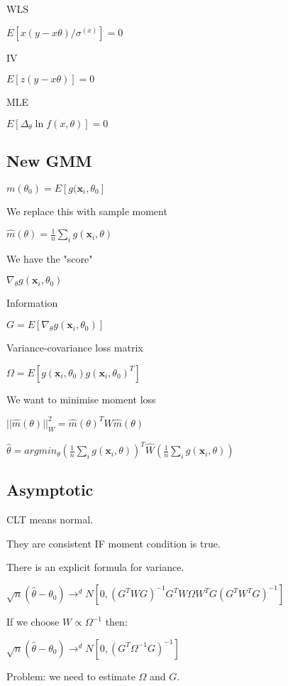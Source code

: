 WLS

\(E[x(y-x\theta)/\sigma^(x)]=0\)

IV

\(E[z(y-x\theta)]=0\)

MLE

\(E[\Delta_\theta \ln f(x, \theta)]=0\)








\subsection{New GMM}


\(m(\theta_0)=E[g(\mathbf x_i, \theta_0]\)

We replace this with sample moment

\(\hat m(\theta)=\frac{1}{n}\sum_ig(\mathbf x_i, \theta)\)

We have the "score"

\(\nabla_\theta g(\mathbf x_i, \theta_0)\)

Information

\(G=E[\nabla_\theta g(\mathbf x_i, \theta_0)]\)

Variance-covariance loss matrix

\(\Omega =E[g(\mathbf x_i, \theta_0)g(\mathbf x_i, \theta_0)^T]\)

We want to minimise moment loss

\(||\hat m(\theta)||^2_W=\hat m(\theta )^TW\hat m(\theta)\)

\(\hat \theta = argmin_\theta (\frac{1}{n}\sum_ig(\mathbf x_i, \theta))^T\hat W(\frac{1}{n}\sum_ig(\mathbf x_i, \theta))\)

\subsection{Asymptotic}

CLT means normal.

They are consistent IF moment condition is true.

There is an explicit formula for variance.


\(\sqrt n (\hat \theta -\theta_0)\rightarrow^d N[0, (G^TWG)^{-1}G^TW\Omega W^TG(G^TW^TG)^{-1}]\)

If we choose \(W\propto \Omega^{-1}\) then:

\(\sqrt n (\hat \theta -\theta_0)\rightarrow^d N[0, (G^T\Omega^{-1} G)^{-1}]\)

Problem: we need to estimate \(\Omega \) and \(G\).

